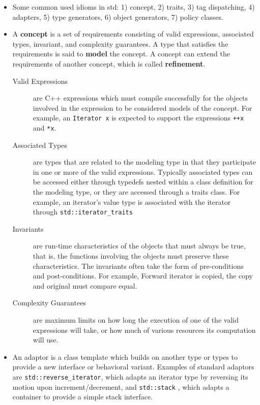 \documentclass[a4paper,11pt,twoside]{book}
\begin{document}
\begin{itemize}
	\item Some common used idioms in std:
1) concept,
2) traits, 
3) tag dispatching,
4) adapters,
5) type generators,
6) object generators,
7) policy classes.

	
	\item A \textbf{concept} is a set of requirements consisting of valid expressions, associated types, invariant, and complexity guarantees. A type that satisfies the requirements is said to \textbf{model} the concept. A concept can extend the requirements of another concept, which is called \textbf{refinement}.

\begin{description}
	\item[Valid Expressions] are C++ expressions which must compile successfully for the objects involved in the expression to be considered models of the concept. For example, an \texttt{Iterator x} is expected to support the expressions \texttt{++x} and \texttt{*x}.
	
	\item[Associated Types] are types that are related to the modeling type in that they participate in one or more of the valid expressions. Typically associated types can be accessed either through typedefs nested within a class definition for the modeling type, or they are accessed through a traits class. For example, an iterator's value type is associated with the iterator through \texttt{std::iterator\_traits}
	
	\item[Invariants] are run-time characteristics of the objects that must always be true, that is, the functions involving the objects must preserve these characteristics. The invariants often take the form of pre-conditions and post-conditions. For example, Forward iterator is copied, the copy and original must compare equal.
	
	\item[Complexity Guarantees] are maximum limits on how long the execution of one of the valid expressions will take, or how much of various resources its computation will use.
\end{description}

	\item An adaptor is a class template which builds on another type or types to provide a new interface or behavioral variant. Examples of standard adaptors are \texttt{std::reverse\_iterator}, which adapts an iterator type by reversing its motion upon increment/decrement, and \texttt{std::stack} , which adapts a container to provide a simple stack interface.
	

\end{itemize}
\end{document}
